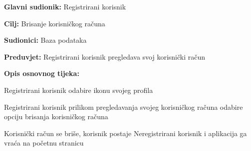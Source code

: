 				
				\noindent {}
				\begin{packed_item}
					
					\item \textbf{Glavni sudionik:} Registrirani korisnik
					\item  \textbf{Cilj:} Brisanje korisničkog računa
					\item  \textbf{Sudionici:} Baza podataka
					\item  \textbf{Preduvjet:} Registrirani korisnik pregledava svoj korisnički račun
					
					\item  \textbf{Opis osnovnog tijeka:}
					\item[] \begin{packed_enum}
						\item Registrirani korisnik odabire ikonu svojeg profila
						\item Registrirani korisnik prilikom pregledavanja svojeg korisničkog računa odabire opciju brisanja korisničkog računa
						\item Korisnički račun se briše, korisnik postaje Neregistrirani korisnik i aplikacija ga vraća na početnu stranicu
					\end{packed_enum}
				\end{packed_item}
				
